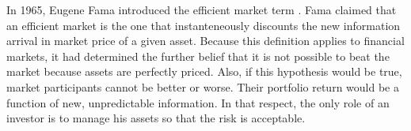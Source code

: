 \documentclass{article}\usepackage[]{graphicx}\usepackage[]{color}
\begin{document}
In 1965, Eugene Fama introduced the efficient market term \cite{Fama1965}. Fama claimed that an efficient market is the one that instanteneously discounts the new information arrival in market price of a given asset. Because this definition applies to financial markets, it had determined the further belief that it is not possible to beat the market because assets are perfectly priced. Also, if this hypothesis would be true, market participants cannot be better or worse. Their portfolio return would be a function of new, unpredictable information. In that respect, the only role of an investor is to manage his assets so that the risk is acceptable. 
\end{document}
